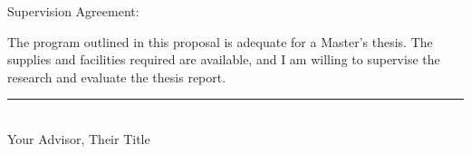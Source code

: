 \vspace{1em}
\noindent Supervision Agreement:

\vspace{1em}
\begin{minipage}{\dimexpr\textwidth-1cm}
\noindent The program outlined in this proposal is adequate for a Master's thesis. The
supplies and facilities required are available, and I am willing to supervise
the research and evaluate the thesis report.
\end{minipage}

\vspace{2em}
\begin{flushright}
    \rule{0.7\linewidth}{0.1pt}\\
    {\normalsize Your Advisor, Their Title}
\end{flushright}

\restoregeometry

\endgroup

